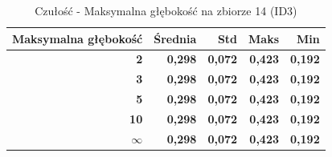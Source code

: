 \begin{table}[htbp]
\centering
\small
\setlength{\tabcolsep}{6pt}
\renewcommand{\arraystretch}{1.2}
\caption{Czułość - Maksymalna głębokość na zbiorze 14 (ID3)}
\label{tab:ID3_max_depth_14_recall}
\begin{tabular}{r|r|r|r|r}
\toprule
Maksymalna głębokość & Średnia & Std & Maks & Min \\
\hline
\textbf{2} & \textbf{0,298} & \textbf{0,072} & \textbf{0,423} & \textbf{0,192} \\
\textbf{3} & \textbf{0,298} & \textbf{0,072} & \textbf{0,423} & \textbf{0,192} \\
\textbf{5} & \textbf{0,298} & \textbf{0,072} & \textbf{0,423} & \textbf{0,192} \\
\textbf{10} & \textbf{0,298} & \textbf{0,072} & \textbf{0,423} & \textbf{0,192} \\
\textbf{$\infty$} & \textbf{0,298} & \textbf{0,072} & \textbf{0,423} & \textbf{0,192} \\
\bottomrule
\end{tabular}
\end{table}